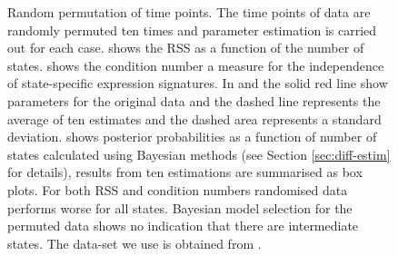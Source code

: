 \begin{figure}
  \centering
  \caption{Random permutation of time points. The time points of data are randomly permuted ten times and parameter estimation is carried out for each case.  shows the RSS as a function of the number of states.  shows the condition number a measure for the independence of state-specific expression signatures. In  and  the solid red line show parameters for the original data and the dashed line represents the average of ten estimates and the dashed area represents a standard deviation.  shows posterior probabilities as a function of number of states calculated using Bayesian methods (see Section \ref{sec:diff-estim} for details), results from ten estimations are summarised as box plots. For both RSS and condition numbers randomised data performs worse for all states. Bayesian model selection for the permuted data shows no indication that there are intermediate states. The data-set we use is obtained from \citep{SamavarchiTehrani:2010cp}.}
\label{fig:permutation-repro}
\end{figure}

